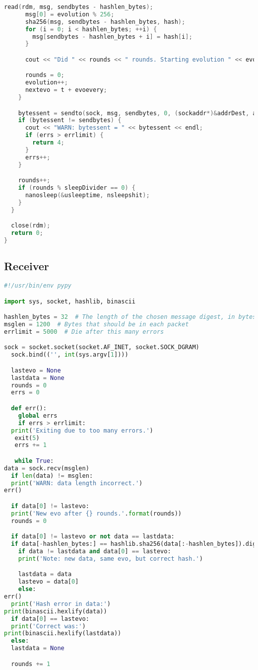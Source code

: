 \begin{appendices}
\begin{lstlisting}[language=C++]
      read(rdm, msg, sendbytes - hashlen_bytes);
      msg[0] = evolution % 256;
      sha256(msg, sendbytes - hashlen_bytes, hash);
      for (i = 0; i < hashlen_bytes; ++i) {
        msg[sendbytes - hashlen_bytes + i] = hash[i];
      }

      cout << "Did " << rounds << " rounds. Starting evolution " << evolution << endl;

      rounds = 0;
      evolution++;
      nextevo = t + evoevery;
    }

    bytessent = sendto(sock, msg, sendbytes, 0, (sockaddr*)&addrDest, ads);
    if (bytessent != sendbytes) {
      cout << "WARN: bytessent = " << bytessent << endl;
      if (errs > errlimit) {
        return 4;
      }
      errs++;
    }

    rounds++;
    if (rounds % sleepDivider == 0) {
      nanosleep(&usleeptime, nsleepshit);
    }
  }

  close(rdm);
  return 0;
}
\end{lstlisting}

\subsection{Receiver}
\begin{lstlisting}[language=Python]
#!/usr/bin/env pypy

import sys, socket, hashlib, binascii

hashlen_bytes = 32  # The length of the chosen message digest, in bytes
msglen = 1200  # Bytes that should be in each packet
errlimit = 5000  # Die after this many errors

sock = socket.socket(socket.AF_INET, socket.SOCK_DGRAM)
  sock.bind(('', int(sys.argv[1])))

  lastevo = None
  lastdata = None
  rounds = 0
  errs = 0

  def err():
    global errs
    if errs > errlimit:
  print('Exiting due to too many errors.')
   exit(5)
   errs += 1

   while True:
data = sock.recv(msglen)
  if len(data) != msglen:
  print('WARN: data length incorrect.')
err()

  if data[0] != lastevo:
  print('New evo after {} rounds.'.format(rounds))
  rounds = 0

  if data[0] != lastevo or not data == lastdata:
  if data[-hashlen_bytes:] == hashlib.sha256(data[:-hashlen_bytes]).digest():
    if data != lastdata and data[0] == lastevo:
    print('Note: new data, same evo, but correct hash.')

    lastdata = data
    lastevo = data[0]
    else:
err()
  print('Hash error in data:')
print(binascii.hexlify(data))
  if data[0] == lastevo:
  print('Correct was:')
print(binascii.hexlify(lastdata))
  else:
  lastdata = None

  rounds += 1
  \end{lstlisting}

  \end{appendices}
